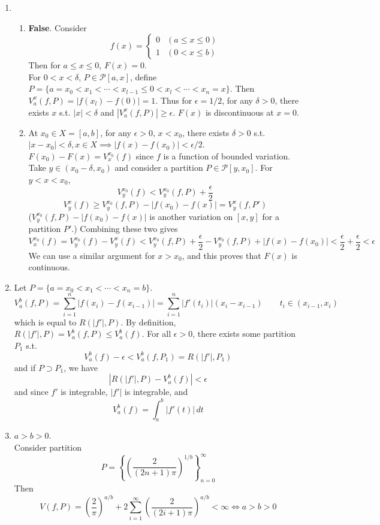 \documentclass[11pt]{report}
\newcommand{\mc}[1]{\mathcal{#1}}
\newcommand{\abs}[1]{\left|#1\right|}
\newcommand{\imp}{\implies}
\begin{document}
\begin{enumerate}
\item
\begin{enumerate}
	\item \textbf{False}. Consider $$f(x) = \begin{cases}
	 	0 & (a \leq x \leq 0) \\ 1 & (0 < x \leq b)
	\end{cases}$$
	Then for $a\leq x\leq 0$, $F(x) = 0$.\\
	For $0 < x < \delta$, $P\in \mc{P}[a, x]$, define $P = \{a = x_0 < x_1 < \cdots < x_{l-1} \leq 0 < x_l < \cdots < x_n =x\}$. Then $V_a^x(f, P) = \abs{f(x_l)-f(0)} = 1$. Thus for $\epsilon = 1/2$, for any $\delta > 0$, there exists $x$ s.t. $\abs{x} < \delta$ and $ \abs{V_a^x(f, P)} \geq \epsilon $. $F(x)$ is discontinuous at $x = 0$.
	\item At $x_0 \in X = [a, b]$, for any $\epsilon > 0$, $x < x_0$, there exists $\delta >0$ s.t. $\abs{x-x_0} < \delta, x\in X \imp \abs{f(x) - f(x_0)} < \epsilon/2$.
	$F(x_0)-F(x) = V_x^{x_0}(f)$ since $f$ is a function of bounded variation. Take $y \in (x_0-\delta, x_0)$ and consider a partition $P\in\mc{P}[y, x_0]$. For $y < x < x_0$,
	$$V_y^{x_0}(f) < V_y^{x_0}(f, P) + \frac{\epsilon}{2}$$
	$$V_y^x(f) \geq V_y^{x_0}(f, P) - \abs{f(x_0) - f(x)} = V_y^x(f, P')$$
	($V_y^{x_0}(f, P) - \abs{f(x_0) - f(x)}$ is another variation on $[x, y]$ for a partition $P'$.) Combining these two gives
	$$V_x^{x_0}(f) = V_y^{x_0}(f) - V_y^x(f) < V_y^{x_0}(f, P) + \frac{\epsilon}{2} - V_y^{x_0}(f, P) + \abs{f(x)-f(x_0)} < \frac{\epsilon}{2}+\frac{\epsilon}{2} < \epsilon$$
	We can use a similar argument for $x > x_0$, and this proves that $F(x)$ is continuous.
\end{enumerate}

\item Let $P = \{a = x_0 < x_1 < \cdots  < x_n = b\}$.
$$V_a^b(f, P) = \sum_{i=1}^n \abs{f(x_i)-f(x_{i-1})} = \sum_{i=1}^n \abs{f'(t_i)}(x_i-x_{i-1}) \qquad t_i\in (x_{i-1}, x_i)$$
which is equal to $R(\abs{f'}, P)$. By definition, $R(\abs{f'}, P) = V_a^b(f, P) \leq V_a^b(f)$.
For all $\epsilon>0$, there exists some partition $P_1$ s.t.
$$V_a^b(f)-\epsilon < V_a^b(f, P_1) = R(\abs{f'}, P_1)$$
and if $P\supset P_1$, we have $$\abs{R(\abs{f'}, P) - V_a^b(f)} < \epsilon$$ and since $f'$ is integrable, $\abs{f'}$ is integrable, and $$V_a^b(f) = \int_a^b \abs{f'(t)}\,dt$$

\item $a > b > 0$.\\
Consider partition $$P = \left\{ \left(\frac{2}{(2n+1)\pi}\right)^{1/b} \right\}_{n=0}^\infty$$
Then $$V(f, P) = \left(\frac{2}{\pi}\right)^{a/b} + 2 \sum_{i=1}^\infty \left(\frac{2}{(2i+1)\pi}\right)^{a/b} < \infty \iff a > b > 0$$


\end{enumerate}
\end{document}
